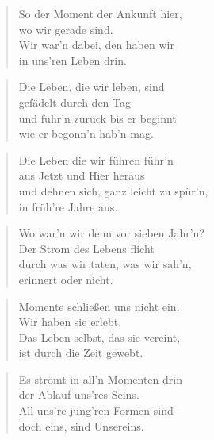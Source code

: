 \documentclass[10pt,a4paper]{article}
\begin{document}
\begin{multicols}{2}
\begin{verse}
So der Moment der Ankunft hier, \\
wo wir gerade sind. \\
Wir war’n dabei, den haben wir \\
in uns’ren Leben drin. \\
\end{verse}

\begin{verse}
Die Leben, die wir leben, sind \\
gefädelt durch den Tag \\
und führ’n zurück bis er beginnt \\
wie er begonn’n hab’n mag. \\
\end{verse}

\begin{verse}
Die Leben die wir führen führ’n \\
aus Jetzt und Hier heraus \\
und dehnen sich, ganz leicht zu spür’n, \\
in früh’re Jahre aus. \\
\end{verse}

\begin{verse}
Wo war’n wir denn vor sieben Jahr’n? \\
Der Strom des Lebens flicht \\
durch was wir taten, was wir sah’n, \\
erinnert oder nicht. \\
\end{verse}

\begin{verse}
Momente schließen uns nicht ein. \\
Wir haben sie erlebt. \\
Das Leben selbst, das sie vereint, \\
ist durch die Zeit gewebt. \\
\end{verse}

\begin{verse}
Es strömt in all’n Momenten drin \\
der Ablauf uns’res Seins. \\
All uns’re jüng’ren Formen sind \\
doch eins, sind Unsereins. \\
\end{verse}


\end{multicols}
\end{document}

